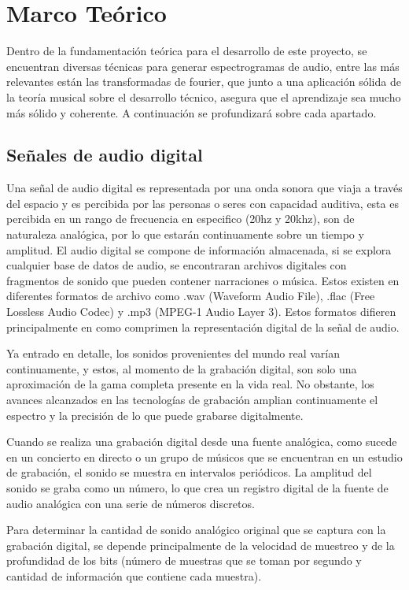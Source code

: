 \section{Marco Teórico}

Dentro de la fundamentación teórica para el desarrollo de este proyecto, se encuentran diversas técnicas para generar espectrogramas de audio, entre las más relevantes están las transformadas de fourier, que junto a una aplicación sólida de la teoría musical sobre el desarrollo técnico, asegura que el aprendizaje sea mucho más sólido y coherente. A continuación se profundizará sobre cada apartado.

\subsection{Señales de audio digital}
Una señal de audio digital es representada por una onda sonora que viaja a través del espacio y es percibida por las personas o seres con capacidad auditiva, esta es percibida en un rango de frecuencia en especifico (20hz y 20khz), son de naturaleza analógica, por lo que estarán continuamente sobre un tiempo y amplitud.
El audio digital se compone de información almacenada, si se explora cualquier base de datos de audio, se encontraran archivos digitales con fragmentos de sonido que pueden contener narraciones o música. Estos existen en diferentes formatos de archivo como .wav (Waveform Audio File), .flac (Free Lossless Audio Codec) y .mp3 (MPEG-1 Audio Layer 3). Estos formatos difieren principalmente en como comprimen la representación digital de la señal de audio.

Ya entrado en detalle, los sonidos provenientes del mundo real varían continuamente, y estos, al momento de la grabación digital, son solo una aproximación de la gama completa presente en la vida real. No obstante, los avances alcanzados en las tecnologías de grabación amplian continuamente el espectro y la precisión de lo que puede grabarse digitalmente.

Cuando se realiza una grabación digital desde una fuente analógica, como sucede en un concierto en directo o un grupo de músicos que se encuentran en un estudio de grabación, el sonido se muestra en intervalos periódicos. La amplitud del sonido se graba como un número, lo que crea un registro digital de la fuente de audio analógica con una serie de números discretos.

Para determinar la cantidad de sonido analógico original que se captura con la grabación digital, se depende principalmente de la velocidad de muestreo y de la profundidad de los bits (número de muestras que se toman por segundo y cantidad de información que contiene cada muestra).

